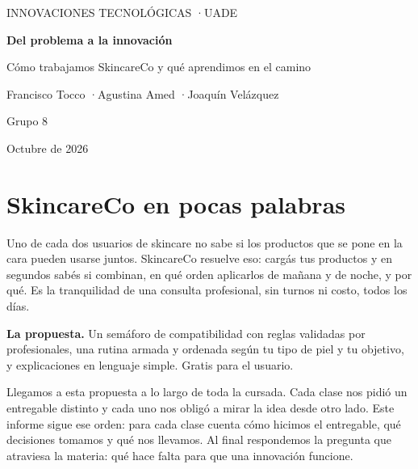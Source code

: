 \documentclass[11pt,a4paper]{article}
\begin{document}
\begin{titlepage}
  \centering
  \vspace*{3cm}
  {\small\color{gris}INNOVACIONES TECNOLÓGICAS \quad·\quad UADE\par}
  \vspace{1.2cm}
  {\Huge\bfseries\color{acento} Del problema a la innovación\par}
  \vspace{0.5cm}
  {\Large Cómo trabajamos SkincareCo y qué aprendimos en el camino\par}
  \vspace{2.5cm}
  {\large Francisco Tocco \quad·\quad Agustina Amed \quad·\quad Joaquín Velázquez\par}
  \vspace{0.4cm}
  {\color{gris}Grupo 8\par}
  \vfill
  {\color{gris}Octubre de 2026\par}
\end{titlepage}

\tableofcontents
\newpage

\section{SkincareCo en pocas palabras}

Uno de cada dos usuarios de skincare no sabe si los productos que se pone en la cara pueden usarse juntos. SkincareCo resuelve eso: cargás tus productos y en segundos sabés si combinan, en qué orden aplicarlos de mañana y de noche, y por qué. Es la tranquilidad de una consulta profesional, sin turnos ni costo, todos los días.

\smallskip
\noindent
\colorbox{suave}{\begin{minipage}{\dimexpr\linewidth-2\fboxsep\relax}
\vspace{4pt}
\textbf{\color{acento}La propuesta.} Un semáforo de compatibilidad con reglas validadas por profesionales, una rutina armada y ordenada según tu tipo de piel y tu objetivo, y explicaciones en lenguaje simple. Gratis para el usuario.
\vspace{4pt}
\end{minipage}}
\smallskip

Llegamos a esta propuesta a lo largo de toda la cursada. Cada clase nos pidió un entregable distinto y cada uno nos obligó a mirar la idea desde otro lado. Este informe sigue ese orden: para cada clase cuenta cómo hicimos el entregable, qué decisiones tomamos y qué nos llevamos. Al final respondemos la pregunta que atraviesa la materia: qué hace falta para que una innovación funcione.
\end{document}
